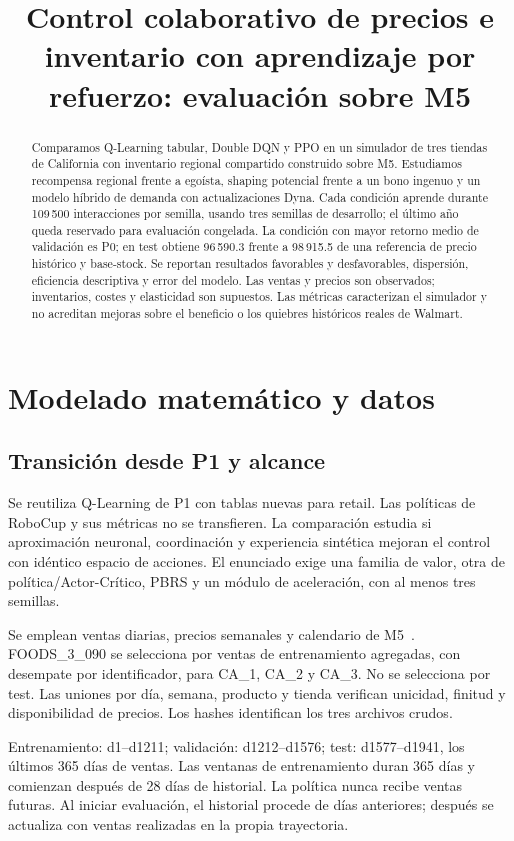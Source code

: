\documentclass[conference]{IEEEtran}
\title{Control colaborativo de precios e inventario con aprendizaje por refuerzo: evaluación sobre M5}
\author{\IEEEauthorblockN{Leonardo Candio y Dimael Rivas}
\IEEEauthorblockA{Universidad de Ingeniería y Tecnología\\DS5345: Aprendizaje por Refuerzo, 2026-II\\
Grupo 1 --- Fase 2, Vía B}}
\begin{document}
\maketitle
\begin{abstract}
Comparamos Q-Learning tabular, Double DQN y PPO en un simulador de tres tiendas de California con inventario regional compartido construido sobre M5. Estudiamos recompensa regional frente a egoísta, shaping potencial frente a un bono ingenuo y un modelo híbrido de demanda con actualizaciones Dyna. Cada condición aprende durante 109\,500 interacciones por semilla, usando tres semillas de desarrollo; el último año queda reservado para evaluación congelada. La condición con mayor retorno medio de validación es P0; en test obtiene 96\,590.3 frente a 98\,915.5 de una referencia de precio histórico y base-stock. Se reportan resultados favorables y desfavorables, dispersión, eficiencia descriptiva y error del modelo. Las ventas y precios son observados; inventarios, costes y elasticidad son supuestos. Las métricas caracterizan el simulador y no acreditan mejoras sobre el beneficio o los quiebres históricos reales de Walmart.
\end{abstract}

\section{Modelado matemático y datos}
\subsection{Transición desde P1 y alcance}
Se reutiliza Q-Learning de P1 con tablas nuevas para retail. Las políticas de RoboCup y sus métricas no se transfieren. La comparación estudia si aproximación neuronal, coordinación y experiencia sintética mejoran el control con idéntico espacio de acciones. El enunciado exige una familia de valor, otra de política/Actor-Crítico, PBRS y un módulo de aceleración, con al menos tres semillas.

Se emplean ventas diarias, precios semanales y calendario de M5~\cite{m5}. FOODS\_3\_090 se selecciona por ventas de entrenamiento agregadas, con desempate por identificador, para CA\_1, CA\_2 y CA\_3. No se selecciona por test. Las uniones por día, semana, producto y tienda verifican unicidad, finitud y disponibilidad de precios. Los hashes identifican los tres archivos crudos.

Entrenamiento: d1--d1211; validación: d1212--d1576; test: d1577--d1941, los últimos 365 días de ventas. Las ventanas de entrenamiento duran 365 días y comienzan después de 28 días de historial. La política nunca recibe ventas futuras. Al iniciar evaluación, el historial procede de días anteriores; después se actualiza con ventas realizadas en la propia trayectoria.
\end{document}
